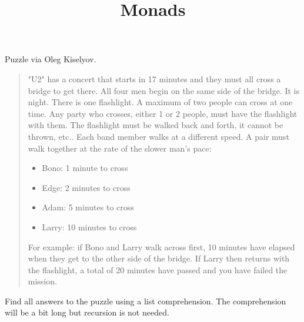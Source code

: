 \documentclass{article}
\newenvironment{quoteenv}{\begin{quote} }{\end{quote}}
{\theorembodyfont{\rmfamily\small}\newtheorem{exercise}{Exercise}}
\begin{document}
{}

{\title{Monads}}

\begin{exercise}
  Puzzle via Oleg Kiselyov.
  
  \begin{quoteenv}
    "U2" has a concert that starts in 17 minutes and they must all cross a
    bridge to get there. All four men begin on the same side of the bridge. It
    is night. There is one flashlight. A maximum of two people can cross at
    one time. Any party who crosses, either 1 or 2 people, must have the
    flashlight with them. The flashlight must be walked back and forth, it
    cannot be thrown, etc.. Each band member walks at a different speed. A
    pair must walk together at the rate of the slower man's pace:
    \begin{itemize}
      \item Bono: 1 minute to cross
      
      \item Edge: 2 minutes to cross
      
      \item Adam: 5 minutes to cross
      
      \item Larry: 10 minutes to cross
    \end{itemize}
    For example: if Bono and Larry walk across first, 10 minutes have elapsed
    when they get to the other side of the bridge. If Larry then returns with
    the flashlight, a total of 20 minutes have passed and you have failed the
    mission.
  \end{quoteenv}
  
  Find all answers to the puzzle using a list comprehension. The comprehension
  will be a bit long but recursion is not needed.
\end{exercise}
\end{document}
